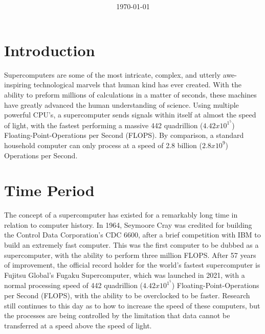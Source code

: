 \documentclass[11pt, twocolumn]{article}
\title{{\large } \thetitle}
\author{\theauthor}
\date{\today}
\begin{document}
\maketitle

\thispagestyle{firstpage}

\section{Introduction}
Supercomputers are some of the most intricate, complex, and utterly awe-inspiring technological marvels that human kind has ever created. With the ability to preform millions of calculations in a matter of seconds, these machines have greatly advanced the human understanding of science. Using multiple powerful CPU's, a supercomputer sends signals within itself at almost the speed of light, with the fastest performing a massive 442 quadrillion (\begin{math}4.42x10^1^5\end{math}) Floating-Point-Operations per Second (FLOPS). By comparison, a standard household computer can only process at a speed of 2.8 billion (\begin{math}2.8x10^9\end{math}) Operations per Second.

\section{Time Period}
The concept of a supercomputer has existed for a remarkably long time in relation to computer history. In 1964, Seymoore Cray was credited for building the Control Data Corporation's CDC 6600, after a brief competition with IBM to build an extremely fast computer. This was the first computer to be dubbed as a supercomputer, with the ability to perform three million FLOPS. After 57 years of improvement, the official record holder for the world's fastest supercomputer is Fujitsu Global's Fugaku Supercomputer, which was launched in 2021, with a normal processing speed of 442 quadrillion (\begin{math}4.42x10^1^5\end{math}) Floating-Point-Operations per Second (FLOPS), with the ability to be overclocked to be faster. Research still continues to this day as to how to increase the speed of these computers, but the processes are being controlled by the limitation that data cannot be transferred at a speed above the speed of light.
\end{document}
